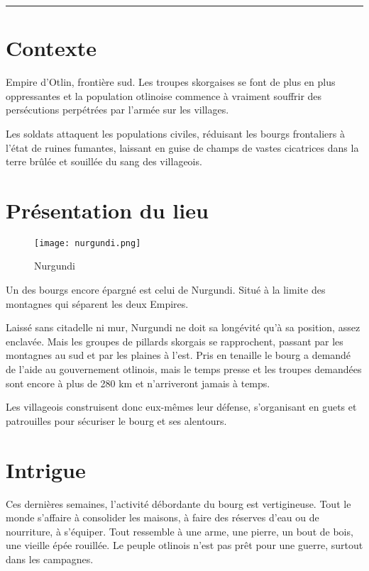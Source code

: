 \documentclass[french, a4paper, 12pt]{article}
\begin{document}
 \maketitle \vspace{3pt} \hrule \vspace{3pt}

\tableofcontents

\section{Contexte}

Empire d'Otlin, frontière sud. Les troupes skorgaises se font de plus en plus oppressantes et la population otlinoise commence à vraiment souffrir des persécutions perpétrées par l'armée sur les villages.

Les soldats attaquent les populations civiles, réduisant les bourgs frontaliers à l'état de ruines fumantes, laissant en guise de champs de vastes cicatrices dans la terre brûlée et souillée du sang des villageois.

\section{Présentation du lieu}

\begin{figure}[htp]
\centering
\texttt{[image: nurgundi.png]}
\caption{Nurgundi}
\end{figure}

Un des bourgs encore épargné est celui de Nurgundi. Situé à la limite des montagnes qui séparent les deux Empires.

Laissé sans citadelle ni mur, Nurgundi ne doit sa longévité qu'à sa position, assez enclavée. Mais les groupes de pillards skorgais se rapprochent, passant par les montagnes au sud et par les plaines à l'est. Pris en tenaille le bourg a demandé de l'aide au gouvernement otlinois, mais le temps presse et les troupes demandées sont encore à plus de 280 km et n'arriveront jamais à temps.

Les villageois construisent donc eux-mêmes leur défense, s'organisant en guets et patrouilles pour sécuriser le bourg et ses alentours.

\section{Intrigue}

Ces dernières semaines, l'activité débordante du bourg est vertigineuse. Tout le monde s'affaire à consolider les maisons, à faire des réserves d'eau ou de nourriture, à s'équiper. Tout ressemble à une arme, une pierre, un bout de bois, une vieille épée rouillée. Le peuple otlinois n'est pas prêt pour une guerre, surtout dans les campagnes.
\end{document}
